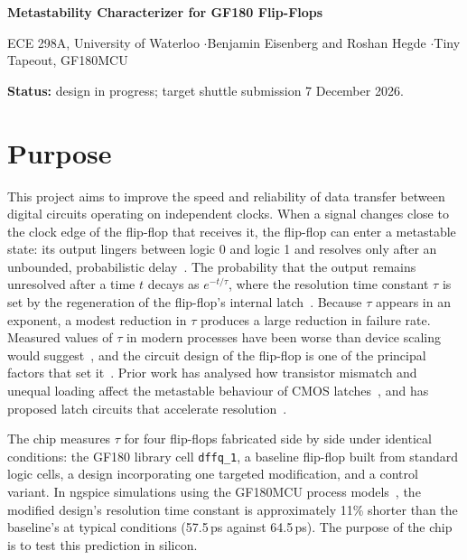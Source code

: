 \documentclass[10pt]{article}
\begin{document}
{\Large\bfseries Metastability Characterizer for GF180 Flip-Flops}\par\vspace{2pt}
ECE 298A, University of Waterloo \quad$\cdot$\quad Benjamin Eisenberg and Roshan Hegde \quad$\cdot$\quad Tiny Tapeout, GF180MCU\par
\textbf{Status:} design in progress; target shuttle submission 7 December 2026.

\section{Purpose}
This project aims to improve the speed and reliability of data transfer between digital circuits operating on
independent clocks. When a signal changes close to the clock edge of the flip-flop that receives it, the flip-flop can
enter a metastable state: its output lingers between logic 0 and logic 1 and resolves only after an unbounded,
probabilistic delay~\cite{ginosar}. The probability that the output remains unresolved after a time $t$ decays as
$e^{-t/\tau}$, where the resolution time constant $\tau$ is set by the regeneration of the flip-flop's internal
latch~\cite{ginosar,portmann}. Because $\tau$ appears in an exponent, a modest reduction in $\tau$ produces a large
reduction in failure rate. Measured values of $\tau$ in modern processes have been worse than device scaling would
suggest~\cite{devolution}, and the circuit design of the flip-flop is one of the principal factors that set
it~\cite{eleven}. Prior work has analysed how transistor mismatch and unequal loading affect the metastable behaviour of CMOS latches~\cite{jeppson}, and has proposed latch circuits that accelerate resolution~\cite{zhou,oracle}.

The chip measures $\tau$ for four flip-flops fabricated side by side under identical conditions: the GF180 library cell
\texttt{dffq\_1}, a baseline flip-flop built from standard logic cells, a design
incorporating one targeted modification, and a control variant. In ngspice simulations using the GF180MCU process
models~\cite{pdk,ngspice}, the modified design's resolution time constant is approximately 11\% shorter than the
baseline's at typical conditions (57.5\,ps against 64.5\,ps). The purpose of the chip is to test this prediction in
silicon.
\end{document}
